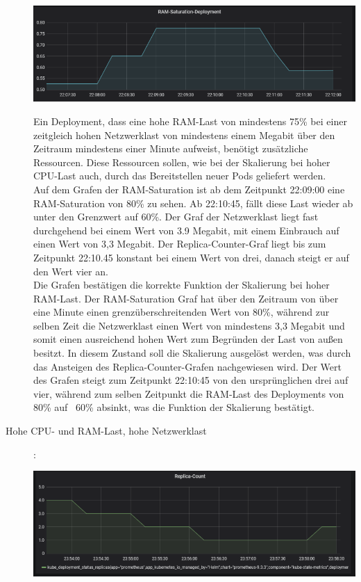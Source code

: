 \documentclass[a4paper,10pt]{scrartcl}
\begin{document}
\begin{description}
\begin{minipage}{\linewidth}
  			\includegraphics[width=1\textwidth]{img/RAMSkalierung/RAMSaturation.PNG}

\end{minipage}

Ein Deployment, dass eine hohe RAM-Last von mindestens 75\% bei einer zeitgleich hohen Netzwerklast von mindestens einem Megabit über den Zeitraum mindestens einer Minute aufweist, benötigt zusätzliche Ressourcen. Diese Ressourcen sollen, wie bei der Skalierung bei hoher CPU-Last auch, durch das Bereitstellen neuer Pods geliefert werden.\\
Auf dem Grafen der RAM-Saturation ist ab dem Zeitpunkt 22:09:00 eine RAM-Saturation von 80\% zu sehen. Ab 22:10:45, fällt diese Last wieder ab unter den Grenzwert auf 60\%. Der Graf der Netzwerklast liegt fast durchgehend bei einem Wert von 3.9 Megabit, mit einem Einbrauch auf einen Wert von 3,3 Megabit. Der \glqq Replica-Counter\grqq -Graf liegt bis zum Zeitpunkt 22:10.45 konstant bei einem Wert von drei, danach steigt er auf den Wert vier an.\\
Die Grafen bestätigen die korrekte Funktion der Skalierung bei hoher RAM-Last. 
Der RAM-Saturation Graf hat über den Zeitraum von über eine Minute einen grenzüberschreitenden Wert von 80\%, während zur selben Zeit die Netzwerklast einen Wert von mindestens 3,3 Megabit und somit einen ausreichend hohen Wert zum Begründen der Last von außen besitzt. In diesem Zustand soll die Skalierung ausgelöst werden, was durch das Ansteigen des \glqq Replica-Counter\grqq -Grafen nachgewiesen wird. Der Wert des Grafen steigt zum Zeitpunkt 22:10:45 von den ursprünglichen drei auf vier, während zum selben Zeitpunkt die RAM-Last des Deployments von 80\% auf ~60\% absinkt, was die Funktion der Skalierung bestätigt.


\pagebreak

\item[Hohe CPU- und RAM-Last, hohe Netzwerklast]:\\

\begin{minipage}{\linewidth}
            \includegraphics[width=1\textwidth]{img/RAMCPUSkalierung/ReplicaCount.PNG}\\
            

\end{minipage}
\end{description}
\end{document}
